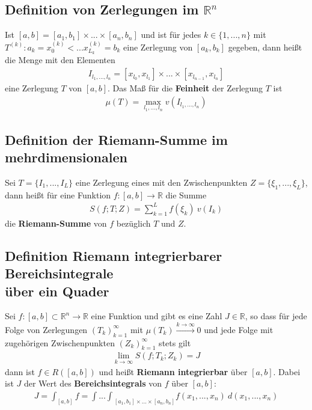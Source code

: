 \documentclass[11pt,a4paper]{book}
\newcommand {\R}	{\mathbb{R}}
\newcommand {\Rn}	{\mathbb{R}^n}
\newcommand{\1}    	{\mathbbm{1}}
\begin{document}
\subsection{Definition von Zerlegungen im \(\Rn\)}
Ist \([a,b] = [a_1,b_1]\times...\times[a_n,b_n] \) und ist für jedes \(k \in \{1,...,n\}\) mit \(T^{(k)} : a_k = x_0^{(k)} < ... x_{L_k}^{(k)} = b_k\) eine Zerlegung von \([a_k,b_k]\) gegeben, dann heißt die Menge mit den Elementen
\begin{align*}
	I_{l_1, ..., l_n} = [x_{l_0},x_{l_1}] \times ... \times [x_{l_{n-1}},x_{l_n}]
\end{align*}
eine Zerlegung \(T\) von \([a,b]\). Das Maß für die \textbf{Feinheit} der Zerlegung \(T\) ist
\begin{align*}
	\mu(T) = \max_{l_1,...,l_n} v\left( I_{l_1, ..., l_n} \right) 
\end{align*}

\subsection{Definition der Riemann-Summe im mehrdimensionalen}
Sei \(T = \{I_1, ..., I_L\} \) eine Zerlegung eines mit den Zwischenpunkten \(Z = \{\xi_1, ..., \xi_L\}\), dann heißt für eine Funktion \(f: [a,b] \rightarrow \R\) die Summe
\begin{align*}
	S(f;T;Z) = \sum_{k=1}^L f(\xi_k) ~ v(I_k)
\end{align*}
die \textbf{Riemann-Summe} von \(f\) bezüglich \(T\) und \(Z\).

\subsection{Definition Riemann integrierbarer Bereichsintegrale\\über ein Quader}
Sei \(f:[a,b] \subset \Rn \rightarrow \R\) eine Funktion und gibt es eine Zahl \(J \in \R\), so dass für jede Folge von Zerlegungen \(\left( T_k \right)_{k=1}^\infty\) mit \(\mu(T_k) \stackrel{k \rightarrow \infty}{\rightarrow} 0\) und jede Folge mit zugehörigen Zwischenpunkten \(\left( Z_k \right)_{k=1}^\infty\) stets gilt
\begin{align*}
	\lim_{k\rightarrow\infty} S(f;T_k;Z_k) = J
\end{align*}
dann ist \(f \in R([a,b])\) und heißt \textbf{Riemann integrierbar} über \([a,b]\). Dabei ist \(J\) der Wert des \textbf{Bereichsintegrals} von \(f\) über \([a,b]\):
\begin{align*}
	J = \int_{[a,b]} f = {\int ... \int}_{[a_1,b_1]\times...\times[a_n,b_n]} f(x_1, ..., x_n) ~d(x_1, ..., x_n)
\end{align*}
\end{document}
